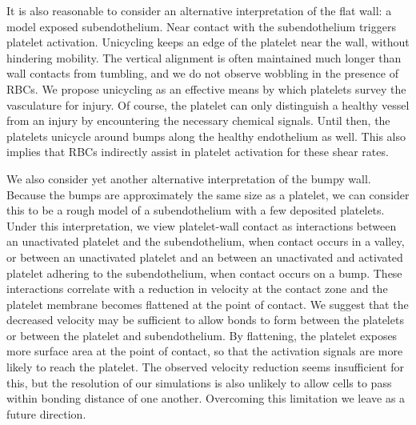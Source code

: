 It is also reasonable to consider an alternative interpretation of the flat wall: a model exposed
subendothelium. Near contact with the subendothelium triggers platelet activation.
Unicycling keeps an edge of the platelet near the wall, without hindering mobility. The
vertical alignment is often maintained much longer than wall contacts from tumbling, and
we do not observe wobbling in the presence of RBCs. We propose unicycling as an effective
means by which platelets survey the vasculature for injury. Of course, the platelet can
only distinguish a healthy vessel from an injury by encountering the necessary chemical
signals. Until then, the platelets unicycle around bumps along the healthy endothelium as
well. This also implies that RBCs indirectly assist in platelet activation for these
shear rates.

We also consider yet another alternative interpretation of the bumpy wall. Because the bumps are
approximately the same size as a platelet, we can consider this to be a rough model of
a subendothelium with a few deposited platelets. Under this interpretation, we view
platelet-wall contact as interactions between an unactivated platelet and the
subendothelium, when contact occurs in a valley, or between an unactivated platelet and
an between an unactivated and activated platelet adhering to the subendothelium, when
contact occurs on a bump.  These interactions correlate with a reduction in velocity at
the contact zone and the platelet membrane becomes flattened at the point of contact. We
suggest that the decreased velocity may be sufficient to allow bonds to form between the
platelets or between the platelet and subendothelium. By flattening, the platelet exposes
more surface area at the point of contact, so that the activation signals are more likely
to reach the platelet. The observed velocity reduction seems insufficient for this, but
the resolution of our simulations is also unlikely to allow cells to pass within bonding
distance of one another. Overcoming this limitation we leave as a future direction.
